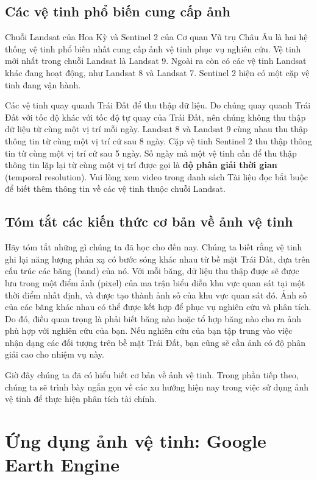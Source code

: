 \subsection{Các vệ tinh phổ biến cung cấp ảnh}

Chuỗi Landsat của Hoa Kỳ và Sentinel 2 của Cơ quan Vũ trụ Châu Âu là hai hệ thống vệ tinh phổ biến nhất cung cấp ảnh vệ tinh phục vụ nghiên cứu. Vệ tinh mới nhất trong chuỗi Landsat là Landsat 9. Ngoài ra còn có các vệ tinh Landsat khác đang hoạt động, như Landsat 8 và Landsat 7. Sentinel 2 hiện có một cặp vệ tinh đang vận hành.

Các vệ tinh quay quanh Trái Đất để thu thập dữ liệu. Do chúng quay quanh Trái Đất với tốc độ khác với tốc độ tự quay của Trái Đất, nên chúng không thu thập dữ liệu từ cùng một vị trí mỗi ngày. Landsat 8 và Landsat 9 cùng nhau thu thập thông tin từ cùng một vị trí cứ sau 8 ngày. Cặp vệ tinh Sentinel 2 thu thập thông tin từ cùng một vị trí cứ sau 5 ngày. Số ngày mà một vệ tinh cần để thu thập thông tin lặp lại từ cùng một vị trí được gọi là \textbf{độ phân giải thời gian} (temporal resolution). Vui lòng xem video trong danh sách Tài liệu đọc bắt buộc để biết thêm thông tin về các vệ tinh thuộc chuỗi Landsat.

\subsection{Tóm tắt các kiến thức cơ bản về ảnh vệ tinh}

Hãy tóm tắt những gì chúng ta đã học cho đến nay. Chúng ta biết rằng vệ tinh ghi lại năng lượng phản xạ có bước sóng khác nhau từ bề mặt Trái Đất, dựa trên cấu trúc các băng (band) của nó. Với mỗi băng, dữ liệu thu thập được sẽ được lưu trong một điểm ảnh (pixel) của ma trận biểu diễn khu vực quan sát tại một thời điểm nhất định, và được tạo thành ảnh số của khu vực quan sát đó. Ảnh số của các băng khác nhau có thể được kết hợp để phục vụ nghiên cứu và phân tích. Do đó, điều quan trọng là phải biết băng nào hoặc tổ hợp băng nào cho ra ảnh phù hợp với nghiên cứu của bạn. Nếu nghiên cứu của bạn tập trung vào việc nhận dạng các đối tượng trên bề mặt Trái Đất, bạn cũng sẽ cần ảnh có độ phân giải cao cho nhiệm vụ này.

Giờ đây chúng ta đã có hiểu biết cơ bản về ảnh vệ tinh. Trong phần tiếp theo, chúng ta sẽ trình bày ngắn gọn về các xu hướng hiện nay trong việc sử dụng ảnh vệ tinh để thực hiện phân tích tài chính.

\section{Ứng dụng ảnh vệ tinh: Google Earth Engine}

